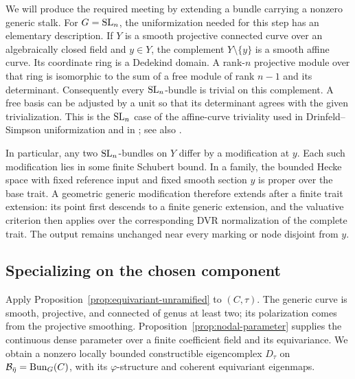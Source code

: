 We will produce the required meeting by extending a bundle carrying
a nonzero generic stalk.  For $G=\mathrm{SL}_n$, the uniformization needed
for this step has an elementary description.  If $Y$ is a smooth
projective connected curve over an algebraically closed field and
$y\in Y$, the complement $Y\setminus\{y\}$ is a smooth affine curve.
Its coordinate ring is a Dedekind domain.  A rank-$n$ projective
module over that ring is isomorphic to the sum of a free module of
rank $n-1$ and its determinant.  Consequently every $\mathrm{SL}_n$-bundle
is trivial on this complement.  A free basis can be adjusted by a
unit so that its determinant agrees with the given trivialization.
This is the $\mathrm{SL}_n$ case of the affine-curve triviality used in
Drinfeld--Simpson uniformization and in
\cite[Theorem~1.1]{BelkaleFakhruddin}; see also
\cite{DrinfeldSimpson}.

In particular, any two $\mathrm{SL}_n$-bundles on $Y$ differ by a
modification at $y$.  Each such modification lies in some finite
Schubert bound.  In a family, the bounded Hecke space with fixed
reference input and fixed smooth section $y$ is proper over the
base trait.  A geometric generic modification therefore extends
after a finite trait extension: its point first descends to a
finite generic extension, and the valuative criterion then applies
over the corresponding DVR normalization of the complete trait.
The output remains unchanged near every
marking or node disjoint from $y$.

\subsection{Specializing on the chosen component}

Apply Proposition~\ref{prop:equivariant-unramified} to $(C,\tau)$.
The generic curve is smooth, projective, and connected of genus at
least two; its polarization comes from the projective smoothing.
Proposition~\ref{prop:nodal-parameter} supplies the continuous dense
parameter over a finite coefficient field and its equivariance.
We obtain a nonzero locally bounded constructible eigencomplex
$D_\tau$ on $\mathcal B_{\bar\eta}=\operatorname{Bun}_G(C)$, with its
$\varphi$-structure and coherent equivariant eigenmaps.

